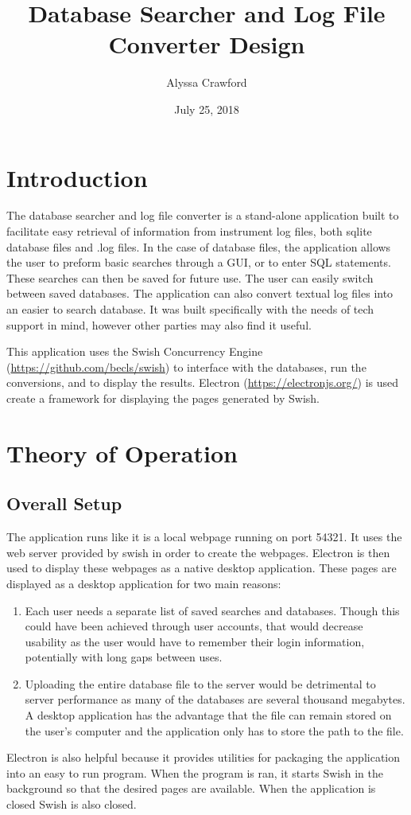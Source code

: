 \documentclass[letterpaper,11pt,twoside,final]{article}
\begin{document}
\title{Database Searcher and Log File Converter Design}
\author{Alyssa Crawford}
\date{July 25, 2018}
\coverpage

\section*{Introduction}
The database searcher and log file converter is a stand-alone
application built to facilitate easy retrieval of information from instrument
log files, both sqlite database files and .log files. In the case of
database files, the application allows the user to preform basic
searches through a GUI, or to enter SQL statements. These searches can
then be saved for future use. The user can easily switch between saved
databases. The application can
also convert textual log files into an easier to search database.
It was built specifically with the
needs of tech support in mind, however other parties may also find it
useful.

This application uses the Swish Concurrency Engine (\url{https://github.com/becls/swish}) to interface with
the databases, run the conversions, and to display the
results. Electron (\url{https://electronjs.org/}) is used create a framework for displaying the pages generated by Swish.  

\section*{Theory of Operation}
\subsection*{Overall Setup}
The application runs like it is a local webpage running on port 54321.
It uses the web server provided by swish in order to
create the webpages. Electron is then used to display these webpages as a native
desktop application. These pages are displayed as a desktop
application for two main reasons:
\begin{enumerate}
  \item Each user needs a separate list of saved searches and
    databases. Though this could have been achieved through user
    accounts, that would decrease usability as the user would have to
    remember their login information, potentially with long gaps between
    uses.
  \item Uploading the entire database file to the server would be detrimental to server performance as many of the databases
    are several thousand megabytes. A desktop application has the
    advantage that the file can remain stored on the user's computer and
    the application only has to store the path to the file.
\end{enumerate}
Electron is also helpful because it provides utilities for packaging
the application into an easy to run program. When the program is ran, it starts Swish in the
background so that the desired pages are available. When the
application is closed Swish is also closed.
\end{document}
